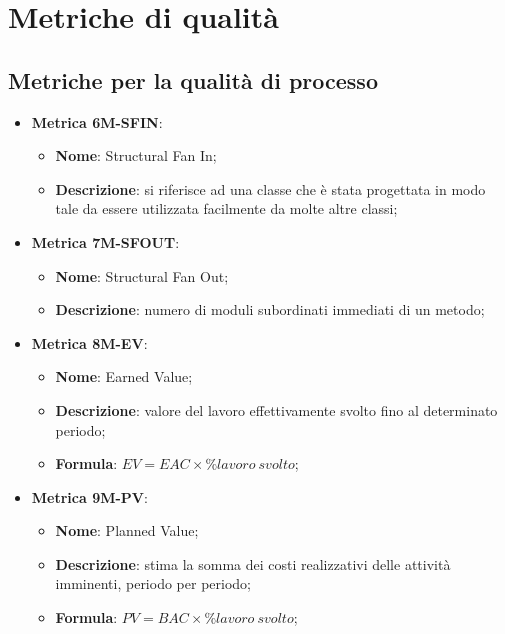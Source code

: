 \section{Metriche di qualità}
\subsection{Metriche per la qualità di processo}




\begin{itemize}
    \item \textbf{Metrica 6M-SFIN}:
    \begin{itemize}
        \item \textbf{Nome}: Structural Fan In;
        \item \textbf{Descrizione}: si riferisce ad una classe che è stata progettata in modo tale da essere utilizzata facilmente da molte altre classi;
    \end{itemize}
\end{itemize}

\begin{itemize}
    \item \textbf{Metrica 7M-SFOUT}:
    \begin{itemize}
        \item \textbf{Nome}: Structural Fan Out;
        \item \textbf{Descrizione}: numero di moduli subordinati immediati di un metodo;
    \end{itemize}
\end{itemize}

\begin{itemize}
    \item \textbf{Metrica 8M-EV}:
    \begin{itemize}
        \item \textbf{Nome}: Earned Value;
        \item \textbf{Descrizione}: valore del lavoro effettivamente svolto fino al determinato periodo;
        \item \textbf{Formula}: $EV = EAC \times \%lavoro\:svolto$;
    \end{itemize}
\end{itemize}

\begin{itemize}
    \item \textbf{Metrica 9M-PV}:
    \begin{itemize}
        \item \textbf{Nome}: Planned Value;
        \item \textbf{Descrizione}: stima la somma dei costi realizzativi delle attività imminenti, periodo per periodo;
        \item \textbf{Formula}: $PV = BAC \times \%lavoro\:svolto$;
    \end{itemize}
\end{itemize}

